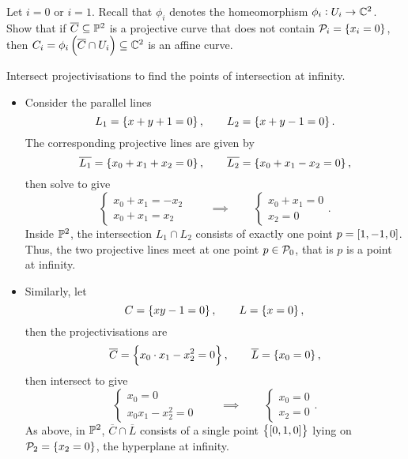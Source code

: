 \begin{exercise}
Let $ i = 0 $ or $ i = 1 $. Recall that $ \phi_i $ denotes the homeomorphism $ \phi_i : U_i \to \C^2 $. Show that if $ \overline{C} \subseteq \P^2 $ is a projective curve that does not contain $ \PP_i = \cbr{x_i = 0} $, then $ C_i = \phi_i\br{\overline{C} \cap U_i} \subseteq \C^2 $ is an affine curve.
\end{exercise}


\begin{example}
Intersect projectivisations to find the points of intersection at infinity.
\begin{itemize}
\item Consider the parallel lines
$$ L_1 = \cbr{x + y + 1 = 0}, \qquad L_2 = \cbr{x + y - 1 = 0}. $$
The corresponding projective lines are given by
$$ \overline{L_1} = \cbr{x_0 + x_1 + x_2 = 0}, \qquad \overline{L_2} = \cbr{x_0 + x_1 - x_2 = 0}, $$
then solve to give
$$
\begin{cases}
x_0 + x_1 = -x_2 \\
x_0 + x_1 = x_2
\end{cases}
\qquad \implies \qquad
\begin{cases}
x_0 + x_1 = 0 \\
x_2 = 0
\end{cases}.
$$
Inside $ \P^2 $, the intersection $ L_1 \cap L_2 $ consists of exactly one point $ p = \sbr{1, -1, 0} $. Thus, the two projective lines meet at one point $ p \in \PP_0 $, that is $ p $ is a point at infinity.
\item Similarly, let
$$ C = \cbr{xy - 1 = 0}, \qquad L = \cbr{x = 0}, $$
then the projectivisations are
$$ \overline{C} = \cbr{x_0 \cdot x_1 - x_2^2 = 0}, \qquad \overline{L} = \cbr{x_0 = 0}, $$
then intersect to give
$$
\begin{cases}
x_0 = 0 \\
x_0x_1 - x_2^2 = 0
\end{cases}
\qquad \implies \qquad
\begin{cases}
x_0 = 0 \\
x_2 = 0
\end{cases}.
$$
As above, in $ \P^2 $, $ \overline{C} \cap \overline{L} $ consists of a single point $ \cbr{\sbr{0, 1, 0}} $ lying on $ \PP_2 = \cbr{x_2 = 0} $, the hyperplane at infinity.
\end{itemize}
\end{example}

\pagebreak

